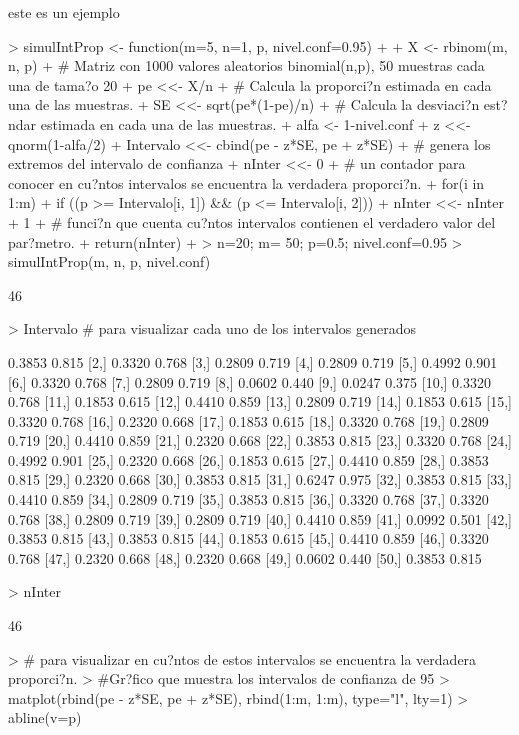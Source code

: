 \documentclass{article}
\begin{document}
este es un ejemplo
\begin{Schunk}
\begin{Sinput}
> simulIntProp <- function(m=5, n=1, p, nivel.conf=0.95)
+ {
+ X <- rbinom(m, n, p)
+ # Matriz con 1000 valores aleatorios binomial(n,p), 50 muestras cada una de tama?o 20
+ pe <<- X/n
+ # Calcula la proporci?n estimada en cada una de las muestras.
+ SE <<- sqrt(pe*(1-pe)/n)
+ # Calcula la desviaci?n est?ndar estimada en cada una de las muestras.
+ alfa <- 1-nivel.conf
+ z <<- qnorm(1-alfa/2)
+ Intervalo <<- cbind(pe - z*SE, pe + z*SE)
+ # genera los extremos del intervalo de confianza
+ nInter <<- 0
+ # un contador para conocer en cu?ntos intervalos se encuentra la verdadera proporci?n.
+ for(i in 1:m)
+ if ((p >= Intervalo[i, 1]) && (p <= Intervalo[i, 2]))
+ nInter <<- nInter + 1
+ # funci?n que cuenta cu?ntos intervalos contienen el verdadero valor del par?metro.
+ return(nInter)
+ }
> n=20; m= 50; p=0.5; nivel.conf=0.95
> simulIntProp(m, n, p, nivel.conf)
\end{Sinput}
\begin{Soutput}
[1] 46
\end{Soutput}
\begin{Sinput}
> Intervalo # para visualizar cada uno de los intervalos generados
\end{Sinput}
\begin{Soutput}
        [,1]  [,2]
 [1,] 0.3853 0.815
 [2,] 0.3320 0.768
 [3,] 0.2809 0.719
 [4,] 0.2809 0.719
 [5,] 0.4992 0.901
 [6,] 0.3320 0.768
 [7,] 0.2809 0.719
 [8,] 0.0602 0.440
 [9,] 0.0247 0.375
[10,] 0.3320 0.768
[11,] 0.1853 0.615
[12,] 0.4410 0.859
[13,] 0.2809 0.719
[14,] 0.1853 0.615
[15,] 0.3320 0.768
[16,] 0.2320 0.668
[17,] 0.1853 0.615
[18,] 0.3320 0.768
[19,] 0.2809 0.719
[20,] 0.4410 0.859
[21,] 0.2320 0.668
[22,] 0.3853 0.815
[23,] 0.3320 0.768
[24,] 0.4992 0.901
[25,] 0.2320 0.668
[26,] 0.1853 0.615
[27,] 0.4410 0.859
[28,] 0.3853 0.815
[29,] 0.2320 0.668
[30,] 0.3853 0.815
[31,] 0.6247 0.975
[32,] 0.3853 0.815
[33,] 0.4410 0.859
[34,] 0.2809 0.719
[35,] 0.3853 0.815
[36,] 0.3320 0.768
[37,] 0.3320 0.768
[38,] 0.2809 0.719
[39,] 0.2809 0.719
[40,] 0.4410 0.859
[41,] 0.0992 0.501
[42,] 0.3853 0.815
[43,] 0.3853 0.815
[44,] 0.1853 0.615
[45,] 0.4410 0.859
[46,] 0.3320 0.768
[47,] 0.2320 0.668
[48,] 0.2320 0.668
[49,] 0.0602 0.440
[50,] 0.3853 0.815
\end{Soutput}
\begin{Sinput}
> nInter
\end{Sinput}
\begin{Soutput}
[1] 46
\end{Soutput}
\begin{Sinput}
> # para visualizar en cu?ntos de estos intervalos se encuentra la verdadera proporci?n.
> #Gr?fico que muestra los intervalos de confianza de 95% que contienen y no contienen el verdadero valor del par?metro p.
> matplot(rbind(pe - z*SE, pe + z*SE), rbind(1:m, 1:m), type="l", lty=1)
> abline(v=p)
\end{Sinput}
\end{Schunk}
\end{document}
